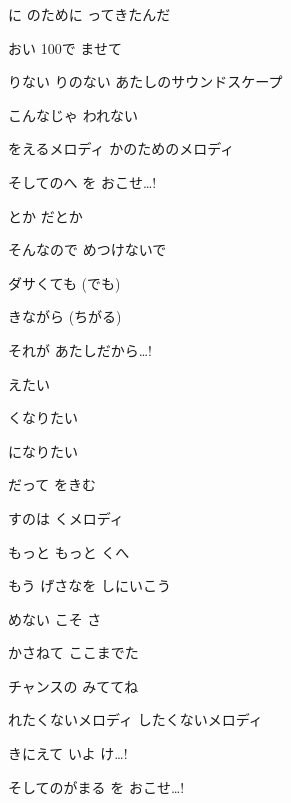 \documentclass[14pt]{extreport}
\begin{document}
{\item
  に のために ってきたんだ
  \jisho{}

  おい 100で ませて
  \jisho{}

  りない りのない あたしのサウンドスケープ
  \jisho{}

  こんなじゃ われない
  \jisho{}

  をえるメロディ かのためのメロディ
  \jisho{}

  そしてのへ を おこせ…!
  \jisho{}

\item
  とか だとか
  \jisho{}

  そんなので めつけないで
  \jisho{}

  ダサくても (でも)
  \jisho{}

  きながら (ちがる)
  \jisho{}

  それが あたしだから…!
  \jisho{}

\item
  えたい
  \jisho{}

  くなりたい
  \jisho{}

  になりたい
  \jisho{}

  だって をきむ
  \jisho{}

  すのは  くメロディ
  \jisho{}

  もっと もっと くへ
  \jisho{}

\item
  もう げさなを しにいこう
  \jisho{}

  めない こそ さ
  \jisho{}

   かさねて ここまでた
  \jisho{}

  チャンスの みててね
  \jisho{}

  れたくないメロディ したくないメロディ
  \jisho{}

  きにえて いよ け…!
  \jisho{}

\item
  そしてのがまる を おこせ…!
  \jisho{}

}
\end{document}
